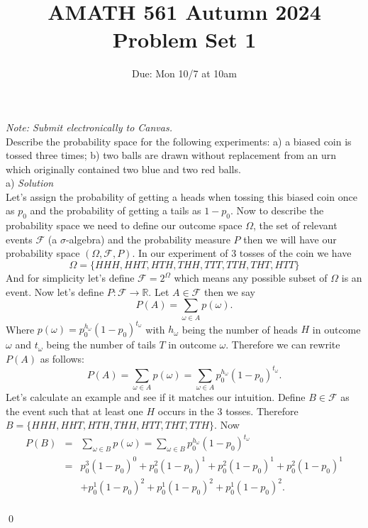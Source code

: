 \documentclass[11pt]{article}
\title{AMATH 561 Autumn 2024 \\ Problem Set 1}
\date{Due: Mon 10/7 at 10am}
\begin{document}
\maketitle

{\it Note: Submit electronically to Canvas.}
\\

 Describe the probability space for the following experiments: a) a biased coin is tossed three times; b)  two balls are drawn without replacement from an urn which originally contained two blue and two red balls. \\
a) \textit{ Solution} \\
Let's assign the probability of getting a heads when tossing this biased coin once as $p_0$ and the probability of getting a tails as $1 - p_0$. 
Now to describe the probability space we need to define our outcome space $\Omega$, the set of relevant events $\mathcal{F}$ (a $\sigma$-algebra) and the
probability measure $P$ then we will have our probability space $\left(\Omega, \mathcal{F}, P\right)$. In our experiment of 3 tosses of the coin we have 
$$\Omega = \{HHH, HHT, HTH, THH, TTT, TTH, THT, HTT\}$$
And for simplicity let's define $\mathcal{F} = 2^\Omega$ which means any possible subset of $\Omega$ is an event.
Now let's define $P: \mathcal{F} \rightarrow \mathbb{R}$.
Let $A \in \mathcal{F}$ then we say $$P(A) = \sum_{\omega \in A} p(\omega).$$
Where $p(\omega) = p_0^{h_{\omega}}(1 - p_0)^{t_{\omega}}$ with ${h_{\omega}}$ being the number of heads $H$ in outcome $\omega$ and ${t_{\omega}}$ being the number of tails $T$ in outcome $\omega$. 
Therefore we can rewrite $P(A)$ as follows:
$$P(A) = \sum_{\omega \in A} p(\omega) = \sum_{\omega \in A} p_0^{h_{\omega}}(1 - p_0)^{t_{\omega}}.$$
Let's calculate an example and see if it matches our intuition.
Define $B \in \mathcal{F}$ as the event such that at least one $H$ occurs in the 3 tosses.
Therefore $B = \{HHH, HHT, HTH, THH, HTT, THT, TTH\}$. Now
\begin{eqnarray*}
P(B) &=& \sum_{\omega \in B} p(\omega) = \sum_{\omega \in B} p_0^{h_{\omega}}(1 - p_0)^{t_{\omega}} \\
&=& p_0^3(1 - p_0)^0 + p_0^2(1 - p_0)^1 + p_0^2(1 - p_0)^1 + p_0^2(1 - p_0)^1 \\
&& + p_0^1(1 - p_0)^2 + p_0^1(1 - p_0)^2 + p_0^1(1 - p_0)^2.
\end{eqnarray*}
\\
\qed
\end{document}
